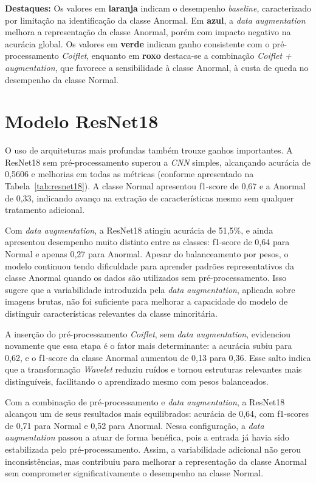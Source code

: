 \begin{flushleft}
\footnotesize
\textbf{Destaques:} Os valores em \textbf{laranja} indicam o desempenho \textit{baseline},
caracterizado por limitação na identificação da classe Anormal.
Em \textbf{azul}, a \textit{data augmentation} melhora a representação da classe Anormal,
porém com impacto negativo na acurácia global.
Os valores em \textbf{verde} indicam ganho consistente com o pré-processamento
\textit{Coiflet}, enquanto em \textbf{roxo} destaca-se a combinação \textit{Coiflet + augmentation},
que favorece a sensibilidade à classe Anormal, à custa de queda no desempenho da
classe Normal.
\end{flushleft}

\section*{Modelo ResNet18}

O uso de arquiteturas mais profundas também trouxe ganhos importantes. A ResNet18 sem pré-processamento superou a \textit{CNN} simples, alcançando acurácia de 0{,}5606 e melhorias em todas as métricas (conforme apresentado na Tabela~\ref{tab:resnet18}). A classe Normal apresentou f1-score de 0{,}67 e a Anormal de 0{,}33, indicando avanço na extração de características mesmo sem qualquer tratamento adicional.

Com \textit{data augmentation}, a ResNet18 atingiu acurácia de 51{,}5\%, e ainda apresentou desempenho muito distinto entre as classes: f1-score de 0{,}64 para Normal e apenas 0{,}27 para Anormal. Apesar do balanceamento por pesos, o modelo continuou tendo dificuldade para aprender padrões representativos da classe Anormal quando os dados são utilizados sem pré-processamento. Isso sugere que a variabilidade introduzida pela \textit{data augmentation}, aplicada sobre imagens brutas, não foi suficiente para melhorar a capacidade do modelo de distinguir características relevantes da classe minoritária.

A inserção do pré-processamento \textit{Coiflet}, sem \textit{data augmentation}, evidenciou novamente que essa etapa é o fator mais determinante: a acurácia subiu para 0{,}62, e o f1-score da classe Anormal aumentou de 0{,}13 para 0{,}36. Esse salto indica que a transformação \textit{Wavelet} reduziu ruídos e tornou estruturas relevantes mais distinguíveis, facilitando o aprendizado mesmo com pesos balanceados.

Com a combinação de pré-processamento e \textit{data augmentation}, a ResNet18 alcançou um de seus resultados mais equilibrados: acurácia de 0{,}64, com f1-scores de 0{,}71 para Normal e 0{,}52 para Anormal. Nessa configuração, a \textit{data augmentation} passou a atuar de forma benéfica, pois a entrada já havia sido estabilizada pelo pré-processamento. Assim, a variabilidade adicional não gerou inconsistências, mas contribuiu para melhorar a representação da classe Anormal sem comprometer significativamente o desempenho na classe Normal.


